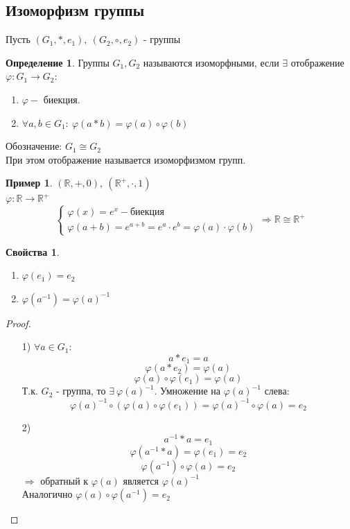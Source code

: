 \documentclass[a4paper, 12pt]{article}
\newcommand{\R}{\mathbb R}
\renewcommand{\phi}{\varphi}
\newcommand\tab[1][.5cm]{\hspace*{#1}}
\theoremstyle{definition}
\newtheorem*{definition}{Определение}
\newtheorem*{example1}{Пример}
\newtheorem*{properties}{Свойства}
\begin{document}
  \subsection{Изоморфизм группы}
  Пусть $(G_1, *, e_1), \ (G_2, \circ, e_2)$  - группы
  \begin{definition}
    Группы $G_1, G_2$ называются изоморфными, если $\exists $ отображение $\phi: G_1 \to G_2: $
    \begin{enumerate}
      \item $\phi - $ биекция. 
      \item $\forall a,b \in G_1: \ \phi(a*b) = \phi(a)\circ\phi(b)$  
    \end{enumerate}
  Обозначение: $G_1\cong G_2$ \\
  При этом отображение называется изоморфизмом групп.  
  \end{definition} 
  \begin{example1}
    $(\R, +, 0), \ (\R^{+}, \cdot, 1)$ \\
    $\phi:\R \to \R^{+}$
    $$\begin{cases}
    \phi(x) = e^x - \text{биекция}\\
    \phi(a+b) = e^{a+b} = e^a \cdot e^b = \phi(a) \cdot \phi(b)
  \end{cases} \Longrightarrow \R \cong \R^+ $$
  \end{example1}
  \begin{properties} \tab
    \begin{enumerate}
      \item $\phi(e_1) = e_2$
      \item $\phi(a^{-1}) = \phi(a)^{-1}$  
    \end{enumerate}
  \end{properties}
  \begin{proof} \tab
    \begin{itemize}
      \item[1)] $\forall a \in G_1:$ $$a * e_1 = a$$ 
      $$\phi(a*e_2) = \phi(a)$$ 
      $$\phi(a) \circ \phi(e_1) = \phi(a)$$
      Т.к. $G_2$ - группа, то $\exists \ \phi(a)^{-1}$. Умножение на $\phi(a)^{-1}$ слева: $$\phi(a)^{-1} \circ (\phi(a) \circ \phi(e_1)) = \phi(a)^{-1} \circ \phi(a) = e_2$$
      \item[2)] $$a^{-1} * a = e_1$$
      $$\phi(a^{-1} * a) = \phi(e_1)= e_2$$
    $$\phi(a^{-1}) \circ \phi(a) = e_2$$
    $\Longrightarrow $ обратный к $\phi(a)$ является $\phi(a)^{-1}$ \\
    Аналогично $\phi(a) \circ \phi(a^{-1}) = e_2$     
    \end{itemize}
  \end{proof} 
\end{document}
